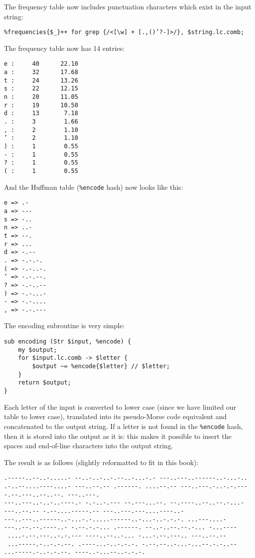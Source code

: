 {The frequency table now includes punctuation characters which exist 
in the input string:

\begin{verbatim}
%frequencies{$_}++ for grep {/<[\w] + [.,()’?-]>/}, $string.lc.comb;
\end{verbatim}

The frequency table now has 14 entries:

\begin{verbatim}
e :     40      22.10
a :     32      17.68
t :     24      13.26
s :     22      12.15
n :     20      11.05
r :     19      10.50
d :     13       7.18
. :     3        1.66
, :     2        1.10
’ :     2        1.10
) :     1        0.55
- :     1        0.55
? :     1        0.55
( :     1        0.55
\end{verbatim}

And the Huffman table (\verb'%encode' hash) now looks like this:

\begin{verbatim}
e => .-
a => ---
s => -..
n => ..-
t => --.
r => ...
d => -.--
. => -.-.-.
( => -.-..-.
’ => -.-.--.
? => -.-..--
) => -.-...-
- => -.-....
, => -.-.---
\end{verbatim}

The encoding subroutine is very simple:

\begin{verbatim}
sub encoding (Str $input, %encode) {
    my $output;
    for $input.lc.comb -> $letter {
        $output ~= %encode{$letter} // $letter;
    }
    return $output;
}
\end{verbatim}

Each letter of the input is converted to lower case (since we have 
limited our table to lower case), translated into its pseudo-Morse 
code equivalent and concatenated to the output string. If a letter
is not found in the \verb'%encode' hash, then it is stored into 
the output as it is: this makes it possible to insert the spaces 
and end-of-line characters into the output string.

The result is as follows (slightly reformatted to fit in this book):
\begin{verbatim}
.-----..--..-.....- --..-..-..-.--..-...-.- ---..---..------..-...-..
.-..--....----....- ---..--.-- .------. ....--.-- ---..---.-..-.-.---
-.--.---..--..--. ---..---.
---..---..-..-..----.- -.-..-.--- --.---...--. --.----..--..--.-...- 
---..--.-- -.--....-----.-- ---..---.---....----..-
---..---..------..-...-.-.....------..-...-..-.-.-. ...---....-
---..--.--.----..- -.--.-.-... .------. --..-..--.--.-... -...----
 ....-.--.---..-.-.--- ----..--..-... -...-.--.---.. ---..--.-- 
 ...-----.-..-.-.--. .----...-..-.-.-. -.--.--..-...-...--.-.-..--
...-----.-..-.-.--. ----..-...--..-.-.-.
\end{verbatim}

}

